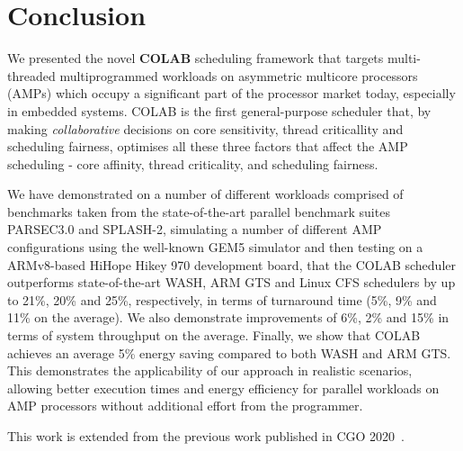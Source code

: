 \vspace{-0.1cm}
\section{Conclusion}

We presented the novel \textbf{COLAB} scheduling framework that targets multi-threaded multiprogrammed workloads on asymmetric multicore processors (AMPs) which occupy a significant part of the processor market today, especially in embedded systems. COLAB is the first general-purpose scheduler that, by making \emph{collaborative} decisions on core sensitivity, thread criticallity and scheduling fairness, optimises all these three factors that affect the AMP scheduling - core affinity, thread criticality, and scheduling fairness. %

We have demonstrated on a number of different workloads comprised of benchmarks taken from the state-of-the-art parallel benchmark suites PARSEC3.0 and SPLASH-2, simulating a number of different AMP configurations using the well-known GEM5 simulator and then testing on a ARMv8-based HiHope Hikey 970 development board, that the COLAB scheduler outperforms state-of-the-art WASH, ARM GTS and Linux CFS schedulers by up to 21\%, 20\% and 25\%, respectively, in terms of turnaround time (5\%, 9\% and 11\% on the average).
We also demonstrate improvements of 6\%, 2\% and 15\% in terms of system throughput on the average. Finally, we show that COLAB achieves an average 5\% energy saving compared to both WASH and ARM GTS. This demonstrates the applicability of our approach in realistic scenarios, allowing better execution times and energy efficiency for parallel workloads on AMP processors without additional effort from the programmer.

This work is extended from the previous work published in CGO 2020~\cite{teng_colab_cgo2020}.
